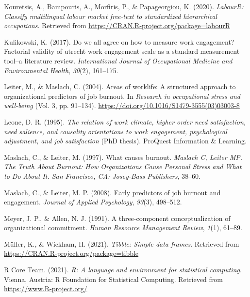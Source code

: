 \documentclass[
  english,
  man]{apa6}
\begin{document}
\leavevmode\hypertarget{ref-R-labourR}{}%
Kouretsis, A., Bampouris, A., Morfiris, P., \& Papageorgiou, K. (2020). \emph{LabourR: Classify multilingual labour market free-text to standardized hierarchical occupations}. Retrieved from \url{https://CRAN.R-project.org/package=labourR}

\leavevmode\hypertarget{ref-kulikowski2017we}{}%
Kulikowski, K. (2017). Do we all agree on how to measure work engagement? Factorial validity of utrecht work engagement scale as a standard measurement tool--a literature review. \emph{International Journal of Occupational Medicine and Environmental Health}, \emph{30}(2), 161--175.

\leavevmode\hypertarget{ref-leiter_areas_2004}{}%
Leiter, M., \& Maslach, C. (2004). Areas of worklife: A structured approach to organizational predictors of job burnout. In \emph{Research in occupational stress and well-being} (Vol. 3, pp. 91--134). \url{https://doi.org/10.1016/S1479-3555(03)03003-8}

\leavevmode\hypertarget{ref-leone_relation_1995}{}%
Leone, D. R. (1995). \emph{The relation of work climate, higher order need satisfaction, need salience, and causality orientations to work engagement, psychological adjustment, and job satisfaction} (PhD thesis). ProQuest Information \& Learning.

\leavevmode\hypertarget{ref-maslach1997causes}{}%
Maslach, C., \& Leiter, M. (1997). What causes burnout. \emph{Maslach C, Leiter MP. The Truth About Burnout: How Organizations Cause Personal Stress and What to Do About It. San Francisco, CA: Josey-Bass Publishers}, 38--60.

\leavevmode\hypertarget{ref-maslach_early_2008}{}%
Maslach, C., \& Leiter, M. P. (2008). Early predictors of job burnout and engagement. \emph{Journal of Applied Psychology}, \emph{93}(3), 498--512.

\leavevmode\hypertarget{ref-meyer_three-component_1991}{}%
Meyer, J. P., \& Allen, N. J. (1991). A three-component conceptualization of organizational commitment. \emph{Human Resource Management Review}, \emph{1}(1), 61--89.

\leavevmode\hypertarget{ref-R-tibble}{}%
Müller, K., \& Wickham, H. (2021). \emph{Tibble: Simple data frames}. Retrieved from \url{https://CRAN.R-project.org/package=tibble}

\leavevmode\hypertarget{ref-R-base}{}%
R Core Team. (2021). \emph{R: A language and environment for statistical computing}. Vienna, Austria: R Foundation for Statistical Computing. Retrieved from \url{https://www.R-project.org/}
\end{document}
